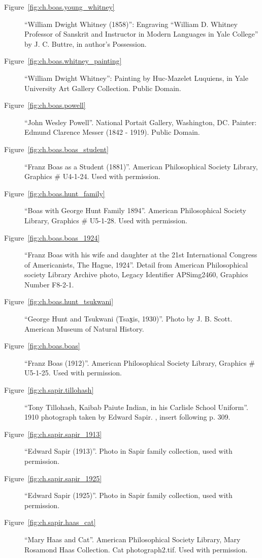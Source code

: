 \begin{description}
\item[Figure~\ref{fig:ch.boas.young_whitney}] ``William Dwight Whitney
  (1858)'': Engraving ``William D. Whitney Professor of Sanskrit and
  Instructor in Modern Languages in Yale College'' by J. C. Buttre, in
  author's Possession.
\item[Figure~\ref{fig:ch.boas.whitney_painting}] ``William Dwight
  Whitney'': Painting by Huc-Mazelet Luquiens, in Yale University Art
  Gallery Collection. Public Domain.
\item[Figure~\ref{fig:ch.boas.powell}] ``John Wesley Powell''. National
  Portait Gallery, Washington, DC. Painter: Edmund Clarence Messer
  (1842 - 1919). Public Domain.
\item[Figure~\ref{fig:ch.boas.boas_student}] ``Franz Boas as a Student
  (1881)''. American Philosophical Society Library, Graphics \#
  U4-1-24. Used with permission.
\item[Figure~\ref{fig:ch.boas.hunt_family}] ``Boas with George Hunt
  Family 1894''. American Philosophical Society Library, Graphics \#
  U5-1-28. Used with permission.
\item[Figure~\ref{fig:ch.boas.boas_1924}] ``Franz Boas with his wife
  and daughter at the 21st International Congress of Americanists, The
  Hague, 1924''. Detail from American Philosophical society Library
  Archive photo, Legacy Identifier APSimg2460, Graphics Number F8-2-1.
\item[Figure~\ref{fig:ch.boas.hunt_tsukwani}] ``George Hunt and
  Tsukwani (Tsax̠is, 1930)''. Photo by J. B. Scott. American Museum of
Natural History.
\item[Figure~\ref{fig:ch.boas.boas}] ``Franz Boas (1912)''. American
  Philosophical Society Library, Graphics \# U5-1-25. Used with permission.
\item[Figure~\ref{fig:ch.sapir.tillohash}] ``Tony Tillohash, Kaibab
  Paiute Indian, in his Carlisle School Uniform''. 1910 photograph
  taken by Edward Sapir. \citealt{sapir30:ute.texts}, insert following
  p. 309.
\item[Figure~\ref{fig:ch.sapir.sapir_1913}] ``Edward Sapir (1913)''.
  Photo in Sapir family collection, used with permission.
\item[Figure~\ref{fig:ch.sapir.sapir_1925}] ``Edward Sapir (1925)''.
  Photo in Sapir family collection, used with permission.
\item[Figure~\ref{fig:ch.sapir.haas_cat}] ``Mary Haas and
  Cat''. American Philosophical Society Library, Mary Rosamond Haas
  Collection. Cat photograph2.tif. Used with permission.

\end{description}
